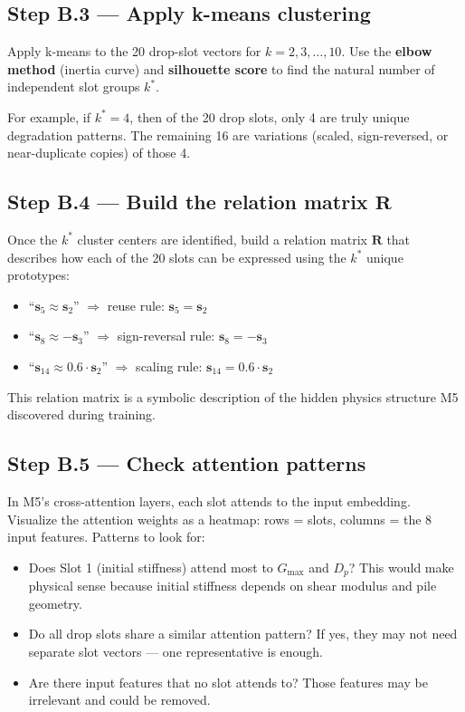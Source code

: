 \documentclass[11pt,a4paper]{article}
\begin{document}
\subsection*{Step B.3 --- Apply k-means clustering}

Apply k-means to the 20 drop-slot vectors for $k = 2, 3, \ldots, 10$. Use the \textbf{elbow method} (inertia curve) and \textbf{silhouette score} to find the natural number of independent slot groups $k^*$.

For example, if $k^* = 4$, then of the 20 drop slots, only 4 are truly unique degradation patterns. The remaining 16 are variations (scaled, sign-reversed, or near-duplicate copies) of those 4.

\subsection*{Step B.4 --- Build the relation matrix $\mathbf{R}$}

Once the $k^*$ cluster centers are identified, build a relation matrix $\mathbf{R}$ that describes how each of the 20 slots can be expressed using the $k^*$ unique prototypes:

\begin{itemize}[nosep]
    \item ``$\mathbf{s}_5 \approx \mathbf{s}_2$'' $\Rightarrow$ reuse rule: $\mathbf{s}_5 = \mathbf{s}_2$
    \item ``$\mathbf{s}_8 \approx -\mathbf{s}_3$'' $\Rightarrow$ sign-reversal rule: $\mathbf{s}_8 = -\mathbf{s}_3$
    \item ``$\mathbf{s}_{14} \approx 0.6 \cdot \mathbf{s}_2$'' $\Rightarrow$ scaling rule: $\mathbf{s}_{14} = 0.6 \cdot \mathbf{s}_2$
\end{itemize}

This relation matrix is a symbolic description of the hidden physics structure M5 discovered during training.

\subsection*{Step B.5 --- Check attention patterns}

In M5's cross-attention layers, each slot attends to the input embedding. Visualize the attention weights as a heatmap: rows = slots, columns = the 8 input features. Patterns to look for:

\begin{itemize}[nosep]
    \item Does Slot 1 (initial stiffness) attend most to $G_{\max}$ and $D_p$? This would make physical sense because initial stiffness depends on shear modulus and pile geometry.
    \item Do all drop slots share a similar attention pattern? If yes, they may not need separate slot vectors --- one representative is enough.
    \item Are there input features that no slot attends to? Those features may be irrelevant and could be removed.
\end{itemize}
\end{document}
